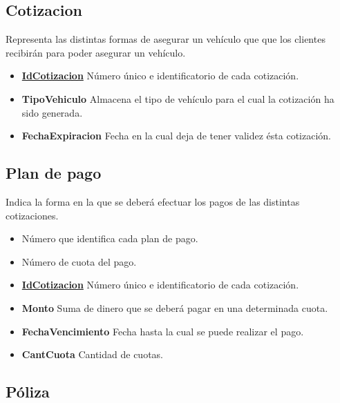 \documentclass[a4paper,11pt]{article}
\begin{document}
\subsection{Cotizacion}

Representa las distintas formas de asegurar un vehículo que  que los clientes recibirán para poder asegurar
un vehículo.

\begin{itemize}

  \item \textbf{\uline{IdCotizacion}} Número único e identificatorio de cada cotización.
  
  \item \textbf{TipoVehiculo} Almacena el tipo de vehículo para el cual la cotización ha sido generada.

  \item \textbf{FechaExpiracion} Fecha en la cual deja de tener validez ésta cotización.
    
\end{itemize}

\subsection{Plan de pago}

Indica la forma en la que se deberá efectuar los pagos de las distintas cotizaciones.

\begin{itemize}

  \item \textbf{} Número que identifica cada plan de pago.

  \item \textbf{} Número de cuota del pago.
    
  \item \textbf{\uline{IdCotizacion}} Número único e identificatorio de cada cotización.
  
  \item \textbf{Monto} Suma de dinero que se deberá pagar en una determinada cuota.

  \item \textbf{FechaVencimiento} Fecha hasta la cual se puede realizar el pago.
  
  \item \textbf{CantCuota} Cantidad de cuotas.
    
\end{itemize}

\subsection{Póliza}
\end{document}
